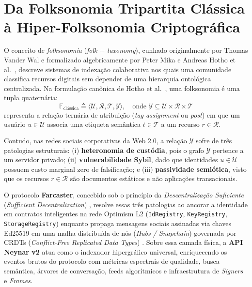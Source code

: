 \documentclass[11pt,a4paper]{article}
\begin{document}
\section{Da Folksonomia Tripartita Clássica à Hiper-Folksonomia Criptográfica}

O conceito de \emph{folksonomia} (\emph{folk} + \emph{taxonomy}), cunhado originalmente por Thomas Vander Wal \cite{vanderwal2007} e formalizado algebricamente por Peter Mika \cite{mika2005} e Andreas Hotho et al.\ \cite{hotho2006}, descreve sistemas de indexação colaborativa nos quais uma comunidade classifica recursos digitais sem depender de uma hierarquia ontológica centralizada. Na formulação canônica de Hotho et al.\ \cite{hotho2006}, uma folksonomia é uma tupla quaternária:
\begin{equation}
  \mathbb{F}_{\text{clássica}} \triangleq \langle \mathcal{U}, \mathcal{R}, \mathcal{T}, \mathcal{Y} \rangle, \quad \text{onde } \mathcal{Y} \subseteq \mathcal{U} \times \mathcal{R} \times \mathcal{T}
\end{equation}
representa a relação ternária de atribuição (\emph{tag assignment} ou \emph{post}) em que um usuário $u \in \mathcal{U}$ associa uma etiqueta semântica $t \in \mathcal{T}$ a um recurso $r \in \mathcal{R}$.

Contudo, nas redes sociais corporativas da Web 2.0, a relação $\mathcal{Y}$ sofre de três patologias estruturais: (i) \textbf{heteronomia de custódia}, pois o grafo $\mathcal{Y}$ pertence a um servidor privado; (ii) \textbf{vulnerabilidade Sybil}, dado que identidades $u \in \mathcal{U}$ possuem custo marginal zero de falsificação; e (iii) \textbf{passividade semiótica}, visto que os recursos $r \in \mathcal{R}$ são documentos estáticos e não aplicações transacionais.

O protocolo \textbf{Farcaster}, concebido sob o princípio da \emph{Descentralização Suficiente} (\emph{Sufficient Decentralization}) \cite{srinivasan2022farcaster}, resolve essas três patologias ao ancorar a identidade em contratos inteligentes na rede Optimism L2 (\texttt{IdRegistry}, \texttt{KeyRegistry}, \texttt{StorageRegistry}) enquanto propaga mensagens sociais assinadas via chaves Ed25519 em uma malha distribuída de nós (\emph{Hubs / Snapchain}) governada por CRDTs (\emph{Conflict-Free Replicated Data Types}) \cite{shapiro2011crdt}. Sobre essa camada física, a \textbf{API Neynar v2} \cite{neynar2025docs} atua como o indexador hipergráfico universal, enriquecendo os eventos brutos do protocolo com métricas espectrais de qualidade, busca semântica, árvores de conversação, feeds algorítmicos e infraestrutura de \emph{Signers} e \emph{Frames}.
\end{document}
